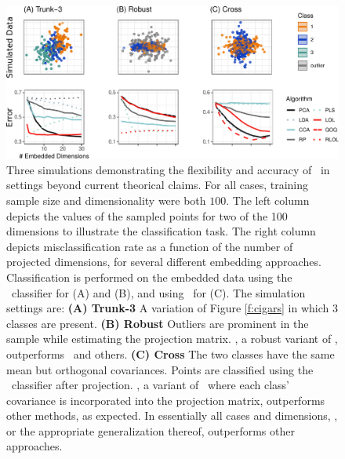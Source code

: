 \documentclass[11pt]{extarticle}
\begin{document}
\begin{figure}[h!]
\centering
\includegraphics[width=1\linewidth]{plot_sims}
\caption{
Three simulations demonstrating the flexibility and accuracy of \Lol~in settings beyond  current theorical claims.
For all cases, training sample size and dimensionality were both $100$. The left column depicts the values of the sampled points for two of the 100 dimensions to illustrate the classification task. The right column depicts misclassification rate as a function of the number of projected dimensions, for several different embedding approaches. 
Classification is performed on the embedded data using the \Lda~classifier for (A) and (B), and using \Qda~for (C).
The simulation settings are:
\textbf{(A) Trunk-3} A variation of Figure {\ref{f:cigars}\color{magenta}{(B)}} in which 3 classes are present.
\textbf{(B) Robust} Outliers  are prominent in the sample while estimating the projection matrix. \Rlol, a robust variant of \Lol, outperforms \Lol~and others.
\textbf{(C) Cross} The two classes have the same mean but orthogonal covariances. Points are classified using the \Qda~classifier after projection. \Qoq, a variant of \Lol~where each class' covariance is incorporated into the projection matrix, outperforms other methods, as expected.
In essentially all  cases and dimensions, \Lol, or the appropriate generalization thereof, outperforms other approaches.
}
\label{f:properties}
\end{figure}
\end{document}
